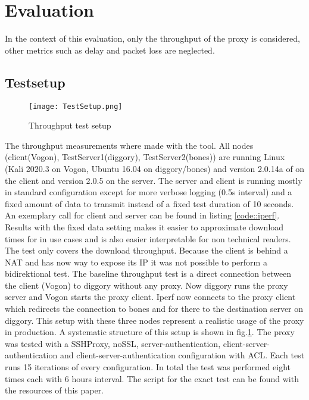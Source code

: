 \documentclass[12pt, a4paper]{scrartcl}
\begin{document}
\section{Evaluation}
In the context of this evaluation, only the throughput of the proxy is considered, other metrics such as delay and packet loss are neglected.
\subsection{Testsetup}
\begin{figure}[b]
    \centering
    \texttt{[image: TestSetup.png]}
    \caption{Throughput test setup}\label{fig::test}
\end{figure}
The throughput measurements where made with the  tool. All nodes (client(Vogon), TestServer1(diggory), TestServer2(bones)) are running Linux (Kali 2020.3 on Vogon, Ubuntu 16.04 on diggory/bones) and version 2.0.14a of  on the client and version 2.0.5 on the server. The  server and client is running mostly in standard configuration except for more verbose logging (0.5s interval) and a fixed amount of data to transmit instead of a fixed test duration of 10 seconds. An exemplary call for client and server can be found in listing \ref{code::iperf}. Results with the fixed data setting makes it easier to approximate download times for in use cases and is also easier interpretable for non technical readers.\newline
The test only covers the download throughput. Because the client is behind a NAT and has now way to expose its IP it was not possible to perform a bidirektional test.\newline
The baseline throughput test is a direct connection between the  client (Vogon) to diggory without any proxy. Now diggory runs the proxy server and Vogon starts the proxy client. Iperf now connects to the proxy client which redirects the connection to bones and for there to the destination  server on diggory. This setup with these three nodes represent a realistic usage of the proxy in production. A systematic structure of this setup is shown in fig.\@\ref{fig::test}.\newline
The proxy was tested with a SSHProxy, noSSL, server-authentication, client-server-authentication and client-server-authentication configuration with \ac{ACL}. Each test runs 15 iterations of every configuration. In total the test was performed eight times each with 6 hours interval. The script for the exact test can be found with the resources of this paper.
\end{document}
